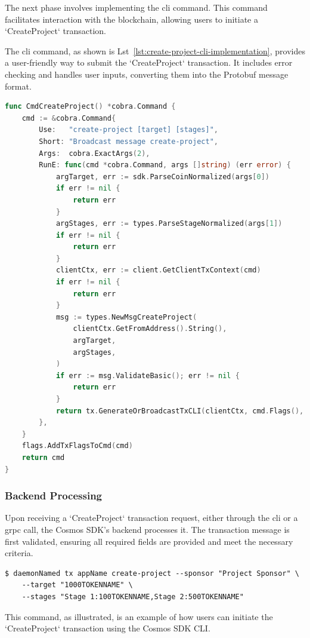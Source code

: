 The next phase involves implementing the \gls{cli} command. This command facilitates interaction with the blockchain, allowing users to initiate a `CreateProject` transaction.

The \gls{cli} command, as shown is Lst~\ref{lst:create-project-cli-implementation}, provides a user-friendly way to submit the `CreateProject` transaction. It includes error checking and handles user inputs, converting them into the Protobuf message format.

\newpage
\begin{lstlisting}[language=go, caption=CreateProject CLI protobuf definition, label={lst:create-project-cli-implementation}]
func CmdCreateProject() *cobra.Command {
	cmd := &cobra.Command{
		Use:   "create-project [target] [stages]",
		Short: "Broadcast message create-project",
		Args:  cobra.ExactArgs(2),
		RunE: func(cmd *cobra.Command, args []string) (err error) {
			argTarget, err := sdk.ParseCoinNormalized(args[0])
			if err != nil {
				return err
			}
			argStages, err := types.ParseStageNormalized(args[1])
			if err != nil {
				return err
			}
			clientCtx, err := client.GetClientTxContext(cmd)
			if err != nil {
				return err
			}
			msg := types.NewMsgCreateProject(
				clientCtx.GetFromAddress().String(),
				argTarget,
				argStages,
			)
			if err := msg.ValidateBasic(); err != nil {
				return err
			}
			return tx.GenerateOrBroadcastTxCLI(clientCtx, cmd.Flags(), msg)
		},
	}
	flags.AddTxFlagsToCmd(cmd)
	return cmd
}
\end{lstlisting}

\subsubsection{Backend Processing}

Upon receiving a `CreateProject` transaction request, either through the \gls{cli} or a \gls{grpc} call, the Cosmos SDK's backend processes it. The transaction message is first validated, ensuring all required fields are provided and meet the necessary criteria.

\begin{verbatim}
$ daemonNamed tx appName create-project --sponsor "Project Sponsor" \
    --target "1000TOKENNAME" \
    --stages "Stage 1:100TOKENNAME,Stage 2:500TOKENNAME"
\end{verbatim}

This command, as illustrated, is an example of how users can initiate the `CreateProject` transaction using the Cosmos SDK CLI.

